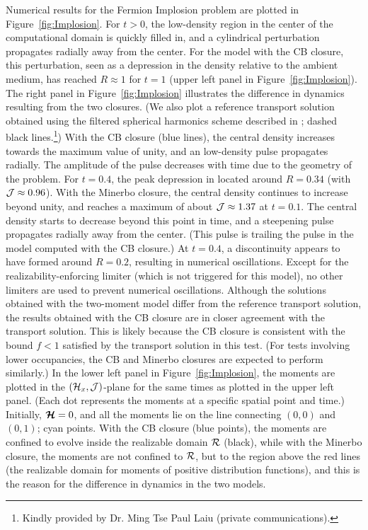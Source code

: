 Numerical results for the Fermion Implosion problem are plotted in Figure~\ref{fig:Implosion}.  
For $t>0$, the low-density region in the center of the computational domain is quickly filled in, and a cylindrical perturbation propagates radially away from the center.  
For the model with the CB closure, this perturbation, seen as a depression in the density relative to the ambient medium, has reached $R\approx1$ for $t=1$ (upper left panel in Figure~\ref{fig:Implosion}).  
The right panel in Figure~\ref{fig:Implosion} illustrates the difference in dynamics resulting from the two closures.  
(We also plot a reference transport solution obtained using the filtered spherical harmonics scheme described in \cite{garrettHauck_2013}; dashed black lines.\footnote{Kindly provided by Dr. Ming Tse Paul Laiu (private communications).})  
With the CB closure (blue lines), the central density increases towards the maximum value of unity, and an low-density pulse propagates radially.  
The amplitude of the pulse decreases with time due to the geometry of the problem.  
For $t=0.4$, the peak depression in located around $R=0.34$ (with $\mathcal{J}\approx0.96$).  
With the Minerbo closure, the central density continues to increase beyond unity, and reaches a maximum of about $\mathcal{J}\approx1.37$ at $t=0.1$.  
The central density starts to decrease beyond this point in time, and a steepening pulse propagates radially away from the center.  
(This pulse is trailing the pulse in the model computed with the CB closure.)  
At $t=0.4$, a discontinuity appears to have formed around $R=0.2$, resulting in numerical oscillations.  
Except for the realizability-enforcing limiter (which is not triggered for this model), no other limiters are used to prevent numerical oscillations.  
Although the solutions obtained with the two-moment model differ from the reference transport solution, the results obtained with the CB closure are in closer agreement with the transport solution.  
This is likely because the CB closure is consistent with the bound $f<1$ satisfied by the transport solution in this test.  
(For tests involving lower occupancies, the CB and Minerbo closures are expected to perform similarly.)  
In the lower left panel in Figure~\ref{fig:Implosion}, the moments are plotted in the $(\mathcal{H}_{x},\mathcal{J})$-plane for the same times as plotted in the upper left panel.  
(Each dot represents the moments at a specific spatial point and time.)  
Initially, $\boldsymbol{\mathcal{H}}=0$, and all the moments lie on the line connecting $(0,0)$ and $(0,1)$; cyan points.  
With the CB closure (blue points), the moments are confined to evolve inside the realizable domain $\mathcal{R}$ (black), while with the Minerbo closure, the moments are not confined to $\mathcal{R}$, but to the region above the red lines (the realizable domain for moments of positive distribution functions), and this is the reason for the difference in dynamics in the two models.  
